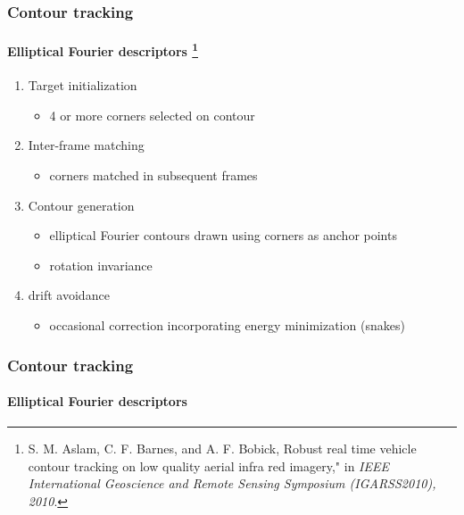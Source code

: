 \begin{frame}
\frametitle{Contour tracking}
\framesubtitle{Elliptical Fourier descriptors \tiny{\footnote{S. M. Aslam, C. F. Barnes, and A. F. Bobick, Robust real time vehicle contour tracking on low quality aerial infra red imagery," in \emph{IEEE International Geoscience and Remote Sensing Symposium (IGARSS2010), 2010}.}}}
\logoCSIPCPL\mypagenum
		\begin{enumerate}
		\item {\color{red}Target initialization}
			\begin{itemize}
				\item 4 or more corners selected on contour
			\end{itemize}
		\item {\color{red}Inter-frame matching}
			\begin{itemize}
				\item corners matched in subsequent frames
			\end{itemize}
		\item {\color{red}Contour generation}
			\begin{itemize}
				\item elliptical Fourier contours drawn using corners as anchor points 
				\item rotation invariance
			\end{itemize}
		\item {\color{red}drift avoidance}
			\begin{itemize}
				\item occasional correction incorporating energy minimization (snakes)
			\end{itemize}
	\end{enumerate}
\end{frame}



\begin{frame}[plain]
\frametitle{Contour tracking}
\framesubtitle{Elliptical Fourier descriptors}
\mypagenum
	\begin{changemargin}{-1.3in}{0in}
	\end{changemargin}
\end{frame}






